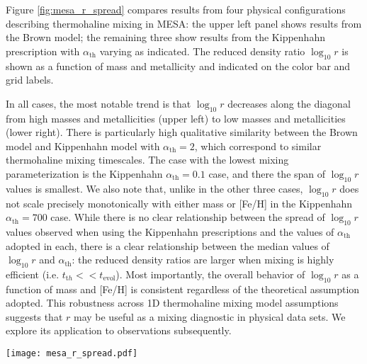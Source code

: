 %
%
Figure \ref{fig:mesa_r_spread} compares results from four physical configurations describing thermohaline mixing in MESA: the upper left panel shows results from the Brown model; the remaining three show results from the Kippenhahn prescription with $\alpha_{\text{th}}$ varying as indicated. The reduced density ratio $\log_{10} r$ is shown as a function of mass and metallicity and indicated on the color bar and grid labels.
%

In all cases, the most notable trend is that $\log_{10} r$ decreases along the diagonal from high masses and metallicities (upper left) to low masses and metallicities (lower right). There is particularly high qualitative similarity between the Brown model and Kippenhahn model with $\alpha_{\text{th}} = 2$, which correspond to similar thermohaline mixing timescales. The case with the lowest mixing parameterization is the Kippenhahn $\alpha_{\text{th}} = 0.1$ case, and there the span of $\log_{10} r$ values is smallest. We also note that, unlike in the other three cases, $\log_{10} r$ does not scale precisely monotonically with either mass or [Fe/H] in the Kippenhahn $\alpha_{\text{th}} = 700$ case. While there is no clear relationship between the spread of $\log_{10} r$ values observed when using the Kippenhahn prescriptions and the values of $\alpha_{\text{th}}$ adopted in each, there is a clear relationship between the median values of $\log_{10} r$ and $\alpha_{\text{th}}$: the reduced density ratios are larger  when mixing is highly efficient (i.e. $t_{\mathrm th} << t_{\text{evol}}$). 
Most importantly, the overall behavior of $\log_{10} r$ as a function of mass and [Fe/H] is consistent regardless of the theoretical assumption adopted.
%
This robustness across 1D thermohaline mixing model assumptions suggests that $r$ may be useful as a mixing diagnostic in physical data sets. We explore its application to observations subsequently.


\begin{figure*}
    \centering
    \texttt{[image: mesa\_r\_spread.pdf]}
    \caption{The reduced density ratio $\log_{10} r$ is extracted as discussed in Section \ref{sec:mesa_experiment} for four grids of stellar models with differing prescriptions for thermohaline mixing. 
    Results for $\log_{10} r$ are shown as a function of stellar mass and metallicity [Fe/H], with high values of $\log_{10} r$ in brighter colors (yellow) and low values of $\log_{10} r$ in darker colors (purple). 
    The model name and mixing efficiency, $\alpha_{\text{th}}$ (where applicable) constitute the physical configuration and are indicated in the panel labels.}
    \label{fig:mesa_r_spread}
\end{figure*}